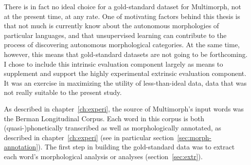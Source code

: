 There is in fact no ideal choice for a gold-standard dataset for Multimorph, 
not at the present time, at any rate. One of motivating factors behind this 
thesis is that not much is currently know about the autonomous morphologies 
of particular languages, and that unsupervised learning can contribute to the 
process of discovering autonomous morphological categories. At the same time, 
however, this means that gold-standard datasets are not going to be forthcoming. 
I chose to include this intrinsic evaluation component largely as means 
to supplement and support the highly experimental extrinsic evaluation 
component.  It was an exercise in maximizing the utility of less-than-ideal data, data that was not really
suitable to the present study.

As described in chapter~\ref{ch:experi}, the source of Multimorph's input words was the 
Berman Longitudinal Corpus. Each word in this corpus is both (quasi-)phonetically 
transcribed as well as morphologically annotated, as described in chapter~\ref{ch:experi} 
(see in particular section~\ref{sec:morph-annotation}).
The first step in 
building the gold-standard data was to extract each word's morphological analysis 
or analyses (section~\ref{sec:extr}). 

